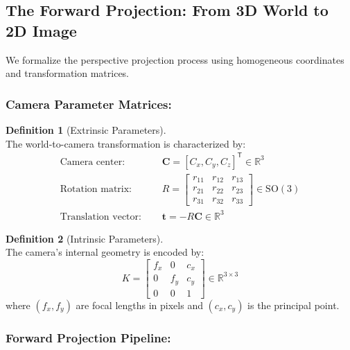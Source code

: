 \documentclass[12pt]{article}
\newcommand{\R}{\mathbb{R}}
\newcommand{\vect}[1]{\bm{#1}}
\theoremstyle{definition}
\newtheorem{definition}{Definition}[subsection]
\begin{document}
\newpage

\subsection{The Forward Projection: From 3D World to 2D Image} \label{sec:forward_projection}

We formalize the perspective projection process using homogeneous coordinates and transformation matrices.

\subsubsection*{Camera Parameter Matrices:}

\begin{definition}[Extrinsic Parameters] \label{def:extrinsic} ~\\
The world-to-camera transformation is characterized by:
\begin{align}
\text{Camera center: } &\quad \vect{C} = [C_x, C_y, C_z]^\mathsf{T} \in \R^3 \\
\text{Rotation matrix: } &\quad R = \begin{bmatrix}
    r_{11} & r_{12} & r_{13} \\
    r_{21} & r_{22} & r_{23} \\
    r_{31} & r_{32} & r_{33}
\end{bmatrix} \in \text{SO}(3) \\
\text{Translation vector: } &\quad \vect{t} = -R \vect{C} \in \R^3
\end{align}
\end{definition}

\begin{definition}[Intrinsic Parameters] \label{def:intrinsic} ~\\
The camera's internal geometry is encoded by:
\begin{equation}
K = \begin{bmatrix}
    f_x & 0 & c_x \\
    0 & f_y & c_y \\
    0 & 0 & 1
\end{bmatrix} \in \R^{3 \times 3} \label{eq:intrinsic}
\end{equation}
where $(f_x, f_y)$ are focal lengths in pixels and $(c_x, c_y)$ is the principal point.
\end{definition}

\subsubsection*{Forward Projection Pipeline:}
\end{document}
